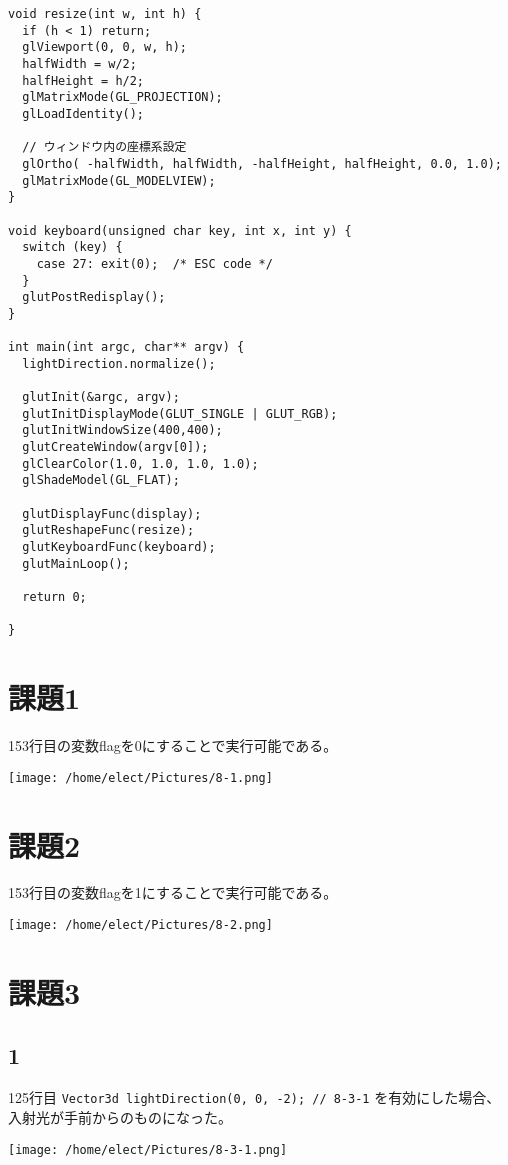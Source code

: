 \documentclass{scrartcl}
\begin{document}
\begin{verbatim}
void resize(int w, int h) {
  if (h < 1) return;
  glViewport(0, 0, w, h);
  halfWidth = w/2;
  halfHeight = h/2;
  glMatrixMode(GL_PROJECTION);
  glLoadIdentity();

  // ウィンドウ内の座標系設定
  glOrtho( -halfWidth, halfWidth, -halfHeight, halfHeight, 0.0, 1.0);
  glMatrixMode(GL_MODELVIEW);
}

void keyboard(unsigned char key, int x, int y) {
  switch (key) {
    case 27: exit(0);  /* ESC code */
  }
  glutPostRedisplay();
}

int main(int argc, char** argv) {
  lightDirection.normalize();

  glutInit(&argc, argv);
  glutInitDisplayMode(GLUT_SINGLE | GLUT_RGB);
  glutInitWindowSize(400,400);
  glutCreateWindow(argv[0]);
  glClearColor(1.0, 1.0, 1.0, 1.0);
  glShadeModel(GL_FLAT);

  glutDisplayFunc(display);
  glutReshapeFunc(resize);
  glutKeyboardFunc(keyboard);
  glutMainLoop();

  return 0;

}
\end{verbatim}
\section{課題1}
\label{sec:orgbd2788f}
153行目の変数flagを0にすることで実行可能である。\\
\begin{center}
\texttt{[image: /home/elect/Pictures/8-1.png]}
\end{center}
\section{課題2}
\label{sec:orgd1467d8}
153行目の変数flagを1にすることで実行可能である。\\
\begin{center}
\texttt{[image: /home/elect/Pictures/8-2.png]}
\end{center}
\section{課題3}
\label{sec:org1903e3a}
\subsection{1}
\label{sec:org20570dc}
125行目 \texttt{Vector3d lightDirection(0, 0, -2); // 8-3-1} を有効にした場合、入射光が手前からのものになった。\\
\begin{center}
\texttt{[image: /home/elect/Pictures/8-3-1.png]}
\end{center}
\end{document}
